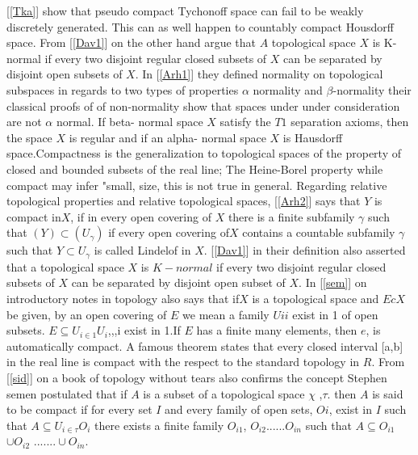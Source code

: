 \documentclass[PhD,14,a4paper]{report}
\theoremstyle{plain}
\theoremstyle{definition}
\theoremstyle{remark}
\numberwithin{figure}{section}
\numberwithin{equation}{subsection}
\begin{document}
{[\ref{Tka}] show that pseudo compact Tychonoff space can fail to be weakly discretely generated. This can as well happen to countably compact Housdorff space. From [\ref{Dav1}] on the other hand argue that $A$ topological space $X$ is K-normal if every two disjoint regular closed subsets of $X$ can be separated by disjoint open subsets of $X$. In [\ref{Arh1}] they defined normality on topological subspaces in regards to two types of properties $\alpha$ normality and $\beta$-normality their classical proofs of  of non-normality show that spaces under under consideration are not $\alpha$ normal. If beta- normal space $X$ satisfy the $T1$ separation axioms, then the space $X$ is regular and if an alpha- normal space $X$ is Hausdorff space.Compactness is the generalization to topological spaces of the property of closed and bounded subsets of the real line; The Heine-Borel property while compact may infer "small, size, this is not true in general.
Regarding relative topological properties and relative topological spaces, [\ref{Arh2}] says that $Y$ is compact in$ X$, if in every open covering of $X $ there is a finite subfamily $\gamma$ such that $(Y)\subset(U_\gamma)$ if every open covering of$ X$ contains a countable subfamily $\gamma$ such that $Y\subset{U}_{\gamma}$ is called Lindelof in $X$. [\ref{Dav1}] in their definition also asserted that a topological space $X$ is $K-normal$ if every two disjoint regular closed subsets of $X$ can be separated by disjoint open subset of $X$. In [\ref{sem}] on introductory notes in topology also says that if$ X$ is a topological space and $E c X$ be given, by an open covering of $E$ we mean a family ${Ui} i$ exist in 1 of open subsets. $E\subseteq U_{i\in 1} U_i$,,,i exist in 1.If $E$ has a finite many elements, then $e$, is automatically compact. A famous theorem states that every closed interval [a,b] in the real line is compact with the respect to the standard topology in $R$. From [\ref{sid}] on a book of topology without tears   also confirms the concept Stephen semen postulated that if $A$ is a subset of a topological space $\chi$ ,$\tau$. then $A$ is said to be compact if for every set $I$ and every family of open sets, $Oi$, exist in $I$ such that $A\subseteq U_{i\in \tau}O_i$ there exists a finite family $O_{i1}$, $O_{i2}$......$O_{in}$ such that $ A\subseteq O_{i1}$ $\cup O_{i2}$ $.......\cup O_{in}$.
}
\end{document}
